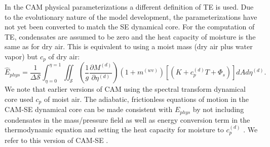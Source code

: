 \documentclass[draft,linenumbers]{agujournal}
\newcommand*{\gi}[1]{\widehat{#1}}
\begin{document}
In the CAM physical parameterizations a different definition of TE is used. Due to the evolutionary nature of the model development, the parameterizations have not yet been converted to match the SE dynamical core. For the computation of TE, condensates are assumed to be zero and the heat capacity of moisture is the same as for dry air. This is equivalent to using a moist mass (dry air plus water vapor) but $c_p$ of dry air:
\begin{equation}
\label{eq:Ephys}
\gi{E}_{phys} =\frac{1}{\Delta \mathcal{S}}\int_{\eta=0}^{\eta=1} \iint_\mathcal{S} \left( \frac{1}{g}\frac{\partial M^{(d)}}{\partial \eta^{(d)}} \right)\left(1+m^{(wv)}\right)\left[ \left(K+c_p^{(d)}T+\Phi_s\right)\right]dA d \eta^{(d)}.
\end{equation}
We note that earlier versions of CAM using the spectral transform dynamical core used $c_p$ of moist air. The adiabatic, frictionless equations of motion in the CAM-SE dynamical core can be made consistent with $E_{phys}$ by not including condensates in the mass/pressure field as well as energy conversion term in the thermodynamic equation and setting the heat capacity for moisture to $c_p^{(d)}$ \citep{T2011LNCSEb}. We refer to this version of CAM-SE {}.
\end{document}
